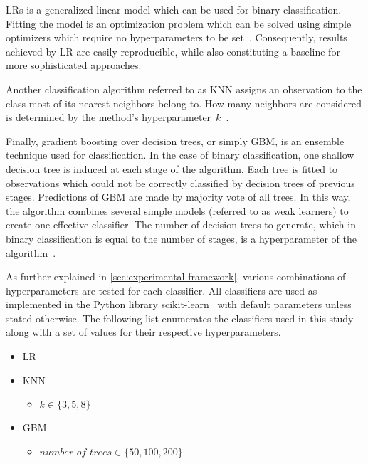 \documentclass[sort&compress]{elsarticle}
\begin{document}
	\acp{LR} is a generalized linear model which can be used for binary classification. Fitting the model is an optimization problem which can be solved using simple optimizers which require no hyperparameters to be set~\citep{McCullagh.1984}. Consequently, results achieved by \ac{LR} are easily reproducible, while also constituting a baseline for more sophisticated approaches.

	Another classification algorithm referred to as \ac{KNN} assigns an observation to the class most of its nearest neighbors belong to. How many neighbors are considered is determined by the method's hyperparameter~$k$~\citep{Fix.1951}.

	Finally, gradient boosting over decision trees, or simply \ac{GBM}, is an ensemble technique used for classification. In the case of binary classification, one shallow decision tree is induced at each stage of the algorithm. Each tree is fitted to observations which could not be correctly classified by decision trees of previous stages. Predictions of \ac{GBM} are made by majority vote of all trees. In this way, the algorithm combines several simple models (referred to as weak learners) to create one effective classifier. The number of decision trees to generate, which in binary classification is equal to the number of stages, is a hyperparameter of the algorithm~\citep{Friedman.2001}. 

	As further explained in \cref{sec:experimental-framework}, various combinations of hyperparameters are tested for each classifier. All classifiers are used as implemented in the Python library scikit-learn~\citep{Pedregosa.2011} with default parameters unless stated otherwise. The following list enumerates the classifiers used in this study along with a set of values for their respective hyperparameters.
	\begin{itemize}
		\item \ac{LR}
		\item \ac{KNN}
		\begin{itemize}
            \item $k \in \{3, 5, 8\}$
		\end{itemize}
		\item \ac{GBM}
		\begin{itemize}
            \item $\textit{number of trees} \in \{50, 100, 200\}$
		\end{itemize}
	\end{itemize}
\end{document}
